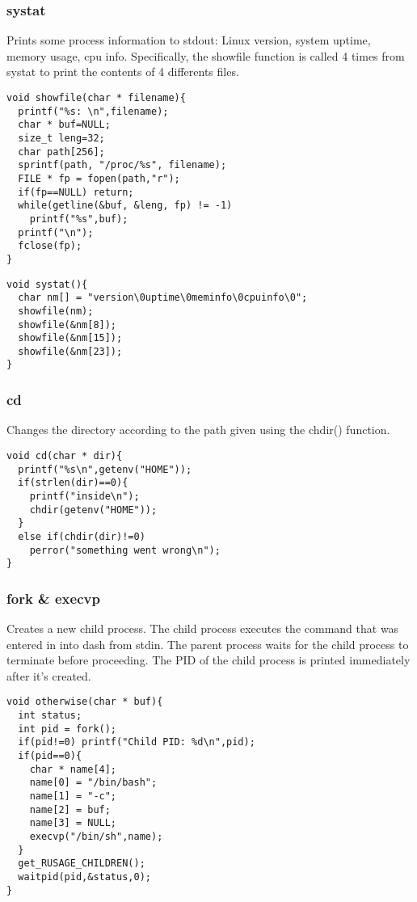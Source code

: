 \documentclass[12pt]{article}
\begin{document}
\noindent \subsubsection*{systat} \par
Prints some process information to stdout: Linux version, 
system uptime, memory usage, cpu info. Specifically, the {\ttfamily showfile} function is called 4 times from {\ttfamily systat} to print the contents of 4 differents files. 
\begin{verbatim}
void showfile(char * filename){
  printf("%s: \n",filename);
  char * buf=NULL;
  size_t leng=32;
  char path[256];
  sprintf(path, "/proc/%s", filename);
  FILE * fp = fopen(path,"r");
  if(fp==NULL) return;
  while(getline(&buf, &leng, fp) != -1)
    printf("%s",buf);
  printf("\n");
  fclose(fp);
}
\end{verbatim}
\newpage
\begin{verbatim}
void systat(){
  char nm[] = "version\0uptime\0meminfo\0cpuinfo\0";
  showfile(nm);
  showfile(&nm[8]);
  showfile(&nm[15]);
  showfile(&nm[23]);
}
\end{verbatim}

\noindent \subsubsection*{cd} \par
Changes the directory according to the path given using the chdir() function.
\begin{verbatim}
void cd(char * dir){
  printf("%s\n",getenv("HOME"));
  if(strlen(dir)==0){ 
    printf("inside\n");
    chdir(getenv("HOME"));
  }
  else if(chdir(dir)!=0) 
    perror("something went wrong\n");
}
\end{verbatim}

\noindent \subsubsection*{fork \& execvp} \par
Creates a new child process. The child process executes the command that 
was entered in into {\ttfamily dash} from {\ttfamily stdin}. The parent process waits for the child process to terminate before proceeding. The PID of the child process is printed immediately after it's created. 
\begin{verbatim}
void otherwise(char * buf){
  int status;
  int pid = fork();
  if(pid!=0) printf("Child PID: %d\n",pid);
  if(pid==0){
    char * name[4];
    name[0] = "/bin/bash";
    name[1] = "-c";
    name[2] = buf;
    name[3] = NULL;
    execvp("/bin/sh",name);
  }
  get_RUSAGE_CHILDREN();
  waitpid(pid,&status,0);
}
\end{verbatim}
\newpage
\end{document}
